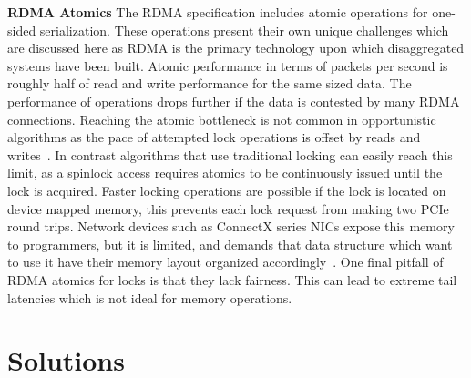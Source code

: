 
\textbf{RDMA Atomics}
The RDMA specification includes atomic operations for one-sided serialization.
These operations present their own unique challenges which are discussed here as
RDMA is the primary technology upon which disaggregated systems have been built.
Atomic performance in terms of packets per second is roughly half of read and
write performance for the same sized data. The performance of operations drops
further if the data is contested by many RDMA connections. Reaching the atomic
bottleneck is not common in opportunistic algorithms as the pace of attempted
lock operations is offset by reads and writes~\cite{clover}. In contrast
algorithms that use traditional locking can easily reach this limit, as a
spinlock access requires atomics to be continuously issued until the lock is
acquired. Faster locking operations are possible if the lock is located on
device mapped memory, this prevents each lock request from making two PCIe round
trips. Network devices such as ConnectX series NICs expose this memory to
programmers, but it is limited, and demands that data structure which want to
use it have their memory layout organized accordingly~\cite{sherman}. One final
pitfall of RDMA atomics for locks is that they lack fairness. This can lead to
extreme tail latencies which is not ideal for memory operations.

\section{Solutions}

